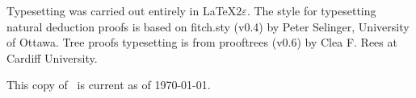 {
Typesetting was carried out entirely in \LaTeX$2\varepsilon$. The style for typesetting natural deduction proofs is based on fitch.sty (v0.4) by Peter Selinger, University of Ottawa. Tree proofs typesetting is from prooftrees (v0.6) by Clea F. Rees at Cardiff University.

This copy of \forallx\ is current as of \today.
}